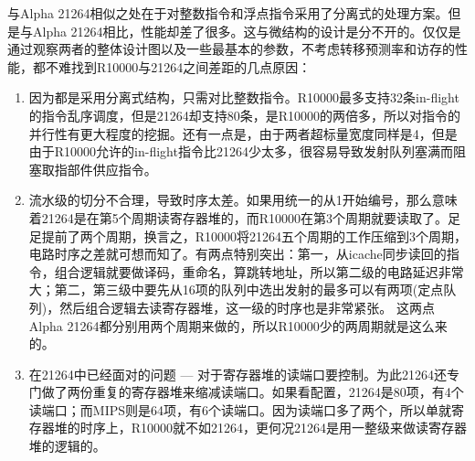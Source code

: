 	与Alpha 21264相似之处在于对整数指令和浮点指令采用了分离式的处理方案。但是与Alpha 21264相比，性能却差了很多。这与微结构的设计是分不开的。仅仅是通过观察两者的整体设计图以及一些最基本的参数，不考虑转移预测率和访存的性能，都不难找到R10000与21264之间差距的几点原因：
	\begin{enumerate}[label=(\alph*)]
		\item 因为都是采用分离式结构，只需对比整数指令。R10000最多支持32条in-flight的指令乱序调度，但是21264却支持80条，是R10000的两倍多，所以对指令的并行性有更大程度的挖掘。还有一点是，由于两者超标量宽度同样是4，但是由于R10000允许的in-flight指令比21264少太多，很容易导致发射队列塞满而阻塞取指部件供应指令。
		\item 流水级的切分不合理，导致时序太差。如果用统一的从1开始编号，那么意味着21264是在第5个周期读寄存器堆的，而R10000在第3个周期就要读取了。足足提前了两个周期，换言之，R10000将21264五个周期的工作压缩到3个周期，电路时序之差就可想而知了。有两点特别突出：第一，从icache同步读回的指令，组合逻辑就要做译码，重命名，算跳转地址，所以第二级的电路延迟非常大；第二，第三级中要先从16项的队列中选出发射的最多可以有两项(定点队列)，然后组合逻辑去读寄存器堆，这一级的时序也是非常紧张。
		这两点Alpha 21264都分别用两个周期来做的，所以R10000少的两周期就是这么来的。
		\item 在21264中已经面对的问题 --- 对于寄存器堆的读端口要控制。为此21264还专门做了两份重复的寄存器堆来缩减读端口。如果看配置，21264是80项，有4个读端口；而MIPS则是64项，有6个读端口。因为读端口多了两个，所以单就寄存器堆的时序上，R10000就不如21264，更何况21264是用一整级来做读寄存器堆的逻辑的。
	\end{enumerate}
	
